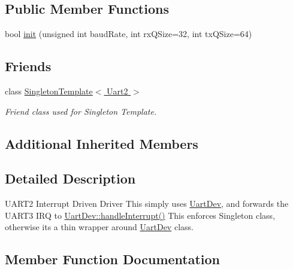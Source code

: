 \subsection*{Public Member Functions}
\begin{DoxyCompactItemize}
\item 
bool \hyperlink{classUart2_a328b32cbfa31e5fef58a1388430473f1}{init} (unsigned int baud\+Rate, int rx\+Q\+Size=32, int tx\+Q\+Size=64)
\end{DoxyCompactItemize}
\subsection*{Friends}
\begin{DoxyCompactItemize}
\item 
class \hyperlink{classUart2_aa3cabc7ab468a1f9ee456587406f857a}{Singleton\+Template$<$ Uart2 $>$}
\begin{DoxyCompactList}\small\item\em Friend class used for Singleton Template. \end{DoxyCompactList}\end{DoxyCompactItemize}
\subsection*{Additional Inherited Members}


\subsection{Detailed Description}
U\+A\+R\+T2 Interrupt Driven Driver This simply uses \hyperlink{classUartDev}{Uart\+Dev}, and forwards the U\+A\+R\+T3 I\+RQ to \hyperlink{classUartDev_a88db44755fb545c2553cabf95a338db4}{Uart\+Dev\+::handle\+Interrupt()} This enforces Singleton class, otherwise it\textquotesingle{}s a thin wrapper around \hyperlink{classUartDev}{Uart\+Dev} class. 

\subsection{Member Function Documentation}
